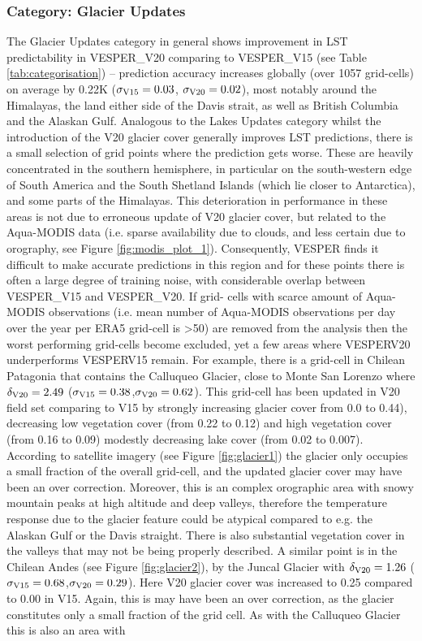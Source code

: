 \documentclass[hess, twostagejnl]{copernicus}
\begin{document}
\subsubsection{Category: Glacier Updates }
The Glacier Updates category in general shows improvement in LST predictability in VESPER\_V20 comparing to VESPER\_V15 (see  Table  \ref{tab:categorisation})  –  prediction  accuracy  increases  globally  (over  1057  grid-cells)  on  average  by  0.22K  ($\sigma_{\rm V15} = 0.03$, $\sigma_{\rm V20} = 0.02$), most notably around the Himalayas, the land either side of the Davis strait, as well as British Columbia and the Alaskan Gulf. Analogous to the Lakes Updates category whilst the introduction of the V20 glacier cover generally improves LST predictions, there is a small selection of grid points where the prediction gets worse. These are heavily concentrated  in  the  southern  hemisphere,  in  particular  on  the  south-western  edge  of  South  America  and  the  South Shetland Islands (which lie closer to Antarctica), and some parts of the Himalayas. This deterioration in performance in these areas is not due to erroneous update of V20 glacier cover, but related to the Aqua-MODIS data (i.e. sparse availability due to clouds, and less certain due to orography, see Figure \ref{fig:modis_plot_1}). Consequently, VESPER finds it difficult to make accurate predictions in this region and for these points there is often a large degree of training noise, with considerable overlap between VESPER\_V15 and VESPER\_V20. If grid- cells with scarce amount of Aqua-MODIS observations (i.e. mean number of Aqua-MODIS observations per day over the year per ERA5 grid-cell is >50) are removed from the analysis then the worst performing grid-cells become excluded, yet a few areas where VESPERV20 underperforms VESPERV15 remain. For  example, there is a grid-cell in Chilean Patagonia that contains the Calluqueo Glacier, close to Monte San Lorenzo where $\delta_{\rm V20} = 2.49$ ($\sigma_{\rm V15} = 0.38$,$\sigma_{\rm V20} = 0.62$). This grid-cell has been updated in V20 field set comparing to V15 by strongly increasing glacier cover from 0.0 to 0.44), decreasing low vegetation cover (from 0.22 to 0.12) and high vegetation cover (from 0.16 to 0.09) modestly decreasing lake cover (from 0.02 to 0.007). According to satellite imagery (see Figure \ref{fig:glacier1}) the glacier only occupies a small fraction of the overall grid-cell, and the updated glacier cover may have been an over correction. Moreover, this is an complex orographic area with snowy mountain peaks at high altitude and deep valleys, therefore the temperature response due to the glacier feature could be atypical compared to e.g. the Alaskan Gulf or the Davis straight. There is also substantial vegetation cover in the valleys that may not be being properly described. A similar point is in the  Chilean Andes (see Figure \ref{fig:glacier2}),  by the Juncal Glacier with $\delta_{\rm V20} = 1.26$ ($\sigma_{\rm V15} = 0.68$,$\sigma_{\rm V20} = 0.29$). Here V20 glacier cover was increased to 0.25 compared to 0.00 in V15. Again, this is may have been an over correction, as the glacier constitutes only a  small fraction of the grid cell. As with the Calluqueo Glacier this is also an area with 
\end{document}
